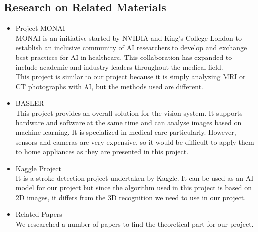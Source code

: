 \subsection{Research on Related Materials}
\begin{itemize}
    \item Project MONAI \\
    MONAI is an initiative started by NVIDIA and King's College London to establish an inclusive community of AI researchers to develop and exchange best practices for AI in healthcare. This collaboration has expanded to include academic and industry leaders throughout the medical field. \\
    This project is similar to our project because it is simply analyzing MRI or CT photographs with AI, but the methods used are different.
    \item BASLER \\
    This project provides an overall solution for the vision system. It supports hardware and software at the same time and can analyse images based on machine learning. It is specialized in medical care particularly. However, sensors and cameras are very expensive, so it would be difficult to apply them to home appliances as they are presented in this project.
    \item Kaggle Project \\
    It is a stroke detection project undertaken by Kaggle. It can be used as an AI model for our project but since the algorithm used in this project is based on 2D images, it differs from the 3D recognition we need to use in our project.
    \item Related Papers \\
    We researched a number of papers to find the theoretical part for our project.\\ 


\end{itemize}
